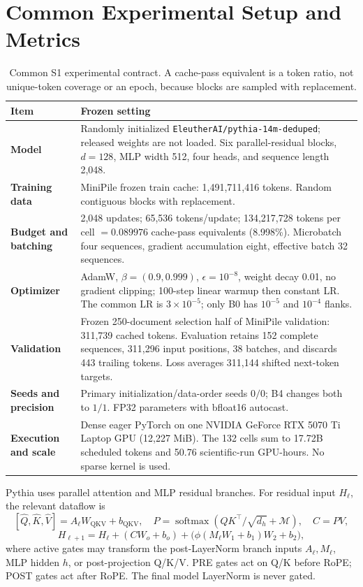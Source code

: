 \documentclass[10pt]{article}
\begin{document}
\section{Common Experimental Setup and Metrics}

\begin{table}[H]
\centering
\small
\caption{Common S1 experimental contract. A cache-pass equivalent is a token
ratio, not unique-token coverage or an epoch, because blocks are sampled with
replacement.}
\label{tab:contract}
\begin{tabularx}{\textwidth}{>{\bfseries}p{} X}
\toprule
Item & Frozen setting \\
\midrule
Model & Randomly initialized \texttt{EleutherAI/pythia-14m-deduped}; released
weights are not loaded. Six parallel-residual blocks, \(d=128\), MLP width
512, four heads, and sequence length 2,048. \\
Training data & MiniPile frozen train cache: 1,491,711,416 tokens. Random
contiguous blocks with replacement. \\
Budget and batching & 2,048 updates; 65,536 tokens/update; 134,217,728 tokens
per cell \(=0.089976\) cache-pass equivalents (8.998\%). Microbatch four
sequences, gradient accumulation eight, effective batch 32 sequences. \\
Optimizer & AdamW, \(\beta=(0.9,0.999)\), \(\epsilon=10^{-8}\), weight decay
0.01, no gradient clipping; 100-step linear warmup then constant LR. The common
LR is \(3\times10^{-5}\); only B0 has \(10^{-5}\) and \(10^{-4}\) flanks. \\
Validation & Frozen 250-document selection half of MiniPile validation:
311,739 cached tokens. Evaluation retains 152 complete sequences, 311,296
input positions, 38 batches, and discards 443 trailing tokens. Loss averages
311,144 shifted next-token targets. \\
Seeds and precision & Primary initialization/data-order seeds \(0/0\); B4
changes both to \(1/1\). FP32 parameters with bfloat16 autocast. \\
Execution and scale & Dense eager PyTorch on one NVIDIA GeForce RTX 5070 Ti
Laptop GPU (12,227 MiB). The 132 cells sum to 17.72B scheduled tokens and
50.76 scientific-run GPU-hours. No sparse kernel is used. \\
\bottomrule
\end{tabularx}
\end{table}

Pythia uses parallel attention and MLP residual branches. For residual input
\(H_\ell\), the relevant dataflow is
\[
[\widehat Q,\widehat K,\widehat V]=A_\ell W_{\mathrm{QKV}}+b_{\mathrm{QKV}},
\quad P=\operatorname{softmax}(QK^\top/\sqrt{d_h}+\mathcal M),
\quad C=PV,
\]
\[
H_{\ell+1}=H_\ell+(CW_o+b_o)+
  \bigl(\phi(M_\ell W_1+b_1)W_2+b_2\bigr),
\]
where active gates may transform the post-LayerNorm branch inputs
\(A_\ell,M_\ell\), MLP hidden \(h\), or post-projection Q/K/V. PRE gates act
on Q/K before RoPE; POST gates act after RoPE. The final model LayerNorm is
never gated.
\end{document}
